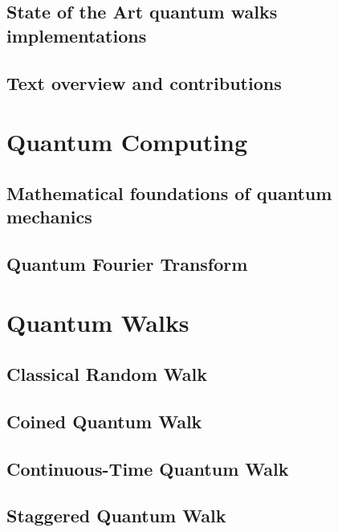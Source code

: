 \documentclass[
oneside,
11pt, a4paper,
footinclude=true,
headinclude=true,
cleardoublepage=empty
]{scrbook}
\begin{document}
\section{State of the Art quantum walks implementations}

\section{Text overview and contributions}


\chapter{Quantum Computing}\label{chap:QuantumComp}
\section{Mathematical foundations of quantum mechanics}

\section{Quantum Fourier Transform}\label{sec:chapQFT}


\chapter{Quantum Walks}\label{chap:QuantumWalks}
\section{Classical Random Walk}\label{sec:chap3ClassicalWalk}

\section{Coined Quantum Walk}\label{sec:chap3Coinedwalk}

\section{Continuous-Time Quantum Walk}\label{sec:chap3Contwalk}

\section{Staggered Quantum Walk}\label{sec:chap3StagWalk}

%
%
\end{document}
